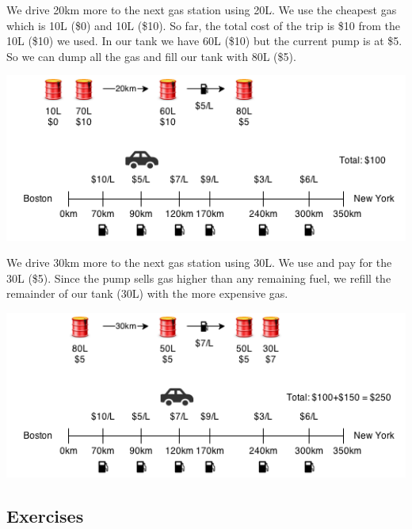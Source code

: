 \documentclass[11pt,oneside]{book}
\makeatletter
\def\maxwidth#1{\ifdim\Gin@nat@width>#1 #1\else\Gin@nat@width\fi}
\makeatother
\begin{document}
We drive 20km more to the next gas station using 20L. We use the cheapest gas which is 10L (\$0) and 10L (\$10). So far, the total cost of the trip is \$10 from the 10L (\$10) we used. In our tank we have 60L (\$10) but the current pump is at \$5. So we can dump all the gas and fill our tank with 80L (\$5).

\vspace{5px}\includegraphics[width=\maxwidth{\textwidth}]{gasproblem3.png}

We drive 30km more to the next gas station using 30L. We use and pay for the 30L (\$5). Since the pump sells gas higher than any remaining fuel, we refill the remainder of our tank (30L) with the more expensive gas.

\vspace{5px}\includegraphics[width=\maxwidth{\textwidth}]{gasproblem4.png}

\subsection{Exercises}
\end{document}

